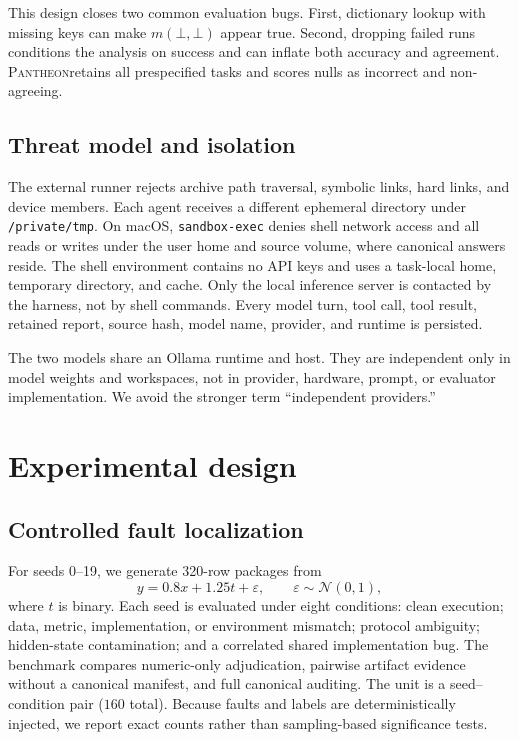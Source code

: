 \documentclass[10pt]{article}
\newcommand{\pantheon}{\textsc{Pantheon}}
\begin{document}
This design closes two common evaluation bugs. First, dictionary lookup with missing keys can make $m(\bot,\bot)$ appear true. Second, dropping failed runs conditions the analysis on success and can inflate both accuracy and agreement. \pantheon retains all prespecified tasks and scores nulls as incorrect and non-agreeing.

\subsection{Threat model and isolation}
The external runner rejects archive path traversal, symbolic links, hard links, and device members. Each agent receives a different ephemeral directory under \texttt{/private/tmp}. On macOS, \texttt{sandbox-exec} denies shell network access and all reads or writes under the user home and source volume, where canonical answers reside. The shell environment contains no API keys and uses a task-local home, temporary directory, and cache. Only the local inference server is contacted by the harness, not by shell commands. Every model turn, tool call, tool result, retained report, source hash, model name, provider, and runtime is persisted.

The two models share an Ollama runtime and host. They are independent only in model weights and workspaces, not in provider, hardware, prompt, or evaluator implementation. We avoid the stronger term ``independent providers.''

\section{Experimental design}
\subsection{Controlled fault localization}
For seeds 0--19, we generate 320-row packages from
\begin{equation}
y=0.8x+1.25t+\varepsilon,\qquad \varepsilon\sim\mathcal{N}(0,1),
\end{equation}
where $t$ is binary. Each seed is evaluated under eight conditions: clean execution; data, metric, implementation, or environment mismatch; protocol ambiguity; hidden-state contamination; and a correlated shared implementation bug. The benchmark compares numeric-only adjudication, pairwise artifact evidence without a canonical manifest, and full canonical auditing. The unit is a seed--condition pair ($160$ total). Because faults and labels are deterministically injected, we report exact counts rather than sampling-based significance tests.
\end{document}
